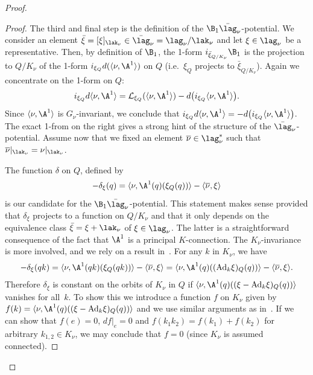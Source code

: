 \begin{proof}
\begin{proof}
  The third and f\/inal step is the def\/inition of the $\B_1\bar\lag_\nu$-potential. We consider an element $\bar \xi = [\xi]_{\lak_\nu} \in \bar\lag_\nu=\lag_\nu/\lak_\nu$ and let $\xi \in \lag_\nu$ be a representative. Then, by def\/inition of $\B_1$, the 1-form $i_{\bar \xi_{Q/K_\nu}}\B_1$ is the projection to $Q/K_\nu$ of the 1-form $i_{\xi_Q}d(\langle\nu,\A^{1}\rangle)$ on $Q$ (i.e.\ $\xi_Q$ projects to $\bar \xi_{Q/K_\nu}$).
  Again we concentrate on the 1-form on $Q$: \[
  i_{\xi_Q}d\langle\nu,\A^{1}\rangle = {\cal L}_{\xi_Q}(\langle\nu,\A^{1}\rangle) - d\big(i_{\xi_Q}\langle\nu,\A^{1}\rangle\big).\] Since $\langle\nu,\A^{1}\rangle$ is $G_\nu$-invariant, we conclude that $i_{\xi_Q}d\langle\nu,\A^{1}\rangle = - d\big(i_{\xi_Q}\langle\nu,\A^{1}\rangle\big)$. The exact 1-from on the right gives a strong hint of the structure of the $\bar\lag_\nu$-potential. Assume now that we f\/ixed an element $\overline\nu \in \lag_\nu^*$ such that $\overline\nu|_{\lak_\nu}=\nu|_{\lak_\nu}$.

  The function $\delta$  on $Q$,  def\/ined by
  \[-\delta_\xi(q) = \langle\nu,\A^{1}(q)(\xi_Q(q))\rangle - \langle \overline\nu,\xi\rangle \] is our candidate for the $\B_1\bar\lag_\nu$-potential. This statement makes sense provided that $\delta_\xi$ projects to a function on $Q/K_\nu$ and that it only depends on the equivalence class $\bar \xi=\xi+\lak_\nu$ of $\xi\in\lag_\nu$. The latter is a straightforward consequence of the fact that $\A^{1}$ is a principal $K$-connection. The $K_\nu$-invariance is more involved, and we rely on a result in~\cite{MarsdenHamRed}. For any $k$ in $K_\nu$, we have
  \begin{gather*}
  - \delta_{\xi}(qk)=  \langle \nu, \A^{1}(qk)(\xi_Q(qk))\rangle - \langle \overline\nu,\xi\rangle = \langle \nu, \A^{1}(q)(({\rm Ad}_{k}\xi)_Q(q))\rangle - \langle \overline\nu,\xi\rangle.
  \end{gather*}
  Therefore $\delta_\xi$ is constant on the orbits of $K_\nu$ in $Q$ if
  $\langle \nu, \A^{1}(q)((\xi-{\rm Ad}_{k}\xi)_Q(q))\rangle$ vanishes for all~$k$. To show this we introduce a function $f$ on $K_\nu$ given by $f(k)=\langle \nu, \A^{1}(q)((\xi-{\rm Ad}_{k}\xi)_Q(q))\rangle$ and we use similar arguments as in~\cite[p.~156]{MarsdenHamRed}. If we can show that $f(e)=0$,  $df|_e=0$ and $f(k_1k_2)=f(k_1)+f(k_2)$ for arbitrary $k_{1,2}\in K_\nu$, we may conclude that  $f=0$ (since $K_\nu$ is assumed connected).


\end{proof}
\end{proof}
